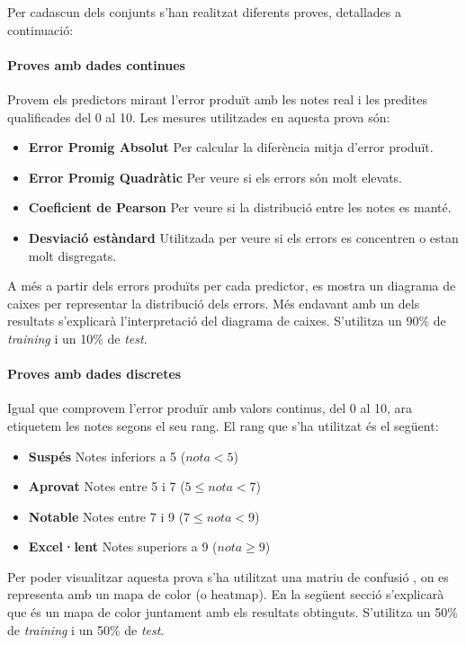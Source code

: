 \documentclass[12pt,a4paper,catalan]{article}
\begin{document}
Per cadascun dels conjunts s'han realitzat diferents proves, detallades a continuació:

\paragraph{Proves amb dades continues}
Provem els predictors mirant l'error produït amb les notes real i les predites qualificades del 0 al 10. Les mesures utilitzades en aquesta prova són:

\begin{itemize}[leftmargin=.5in]
	\item \textbf{Error Promig Absolut} Per calcular la diferència mitja d'error produït.
	\item \textbf{Error Promig Quadràtic} Per veure si els errors són molt elevats.
	\item \textbf{Coeficient de Pearson} Per veure si la distribució entre les notes es manté.
	\item \textbf{Desviació estàndard} Utilitzada per veure si els errors es concentren o estan molt disgregats.
\end{itemize}

A més a partir dels errors produïts per cada predictor, es mostra un diagrama de caixes \cite{boxplot} per representar la distribució dels errors. Més endavant amb un dels resultats s'explicarà l'interpretació del diagrama de caixes. S'utilitza un 90\% de \textit{training} i un 10\% de \textit{test}.


\paragraph{Proves amb dades discretes}
Igual que comprovem l'error produïr amb valors continus, del 0 al 10, ara etiquetem les notes segons el seu rang. El rang que s'ha utilitzat és el següent:

\begin{itemize}[leftmargin=.5in]
	\item \textbf{Suspés} Notes inferiors a 5 ($nota < 5$)
	\item \textbf{Aprovat} Notes entre 5 i 7 ($5 \leq nota < 7 $)
	\item \textbf{Notable} Notes entre 7 i 9 ($7 \leq nota < 9 $)
	\item \textbf{Excel·lent} Notes superiors a 9 ($nota \geq 9$)
\end{itemize}

Per poder visualitzar aquesta prova s'ha utilitzat una matriu de confusió \cite{confusionmatrix}, on es representa amb un mapa de color (o heatmap). En la següent secció s'explicarà que és un mapa de color juntament amb els resultats obtinguts. S'utilitza un 50\% de \textit{training} i un 50\% de \textit{test}.
\end{document}
